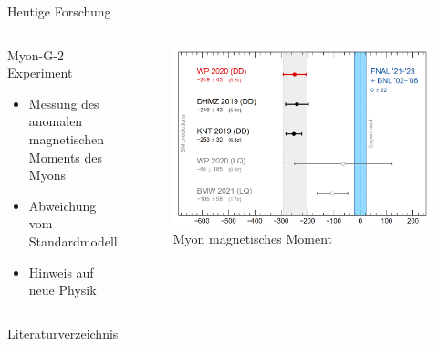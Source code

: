 \documentclass[aspectratio=169,xcolor=dvipsnames]{beamer}
\begin{document}
\begin{frame}{Heutige Forschung}
    \begin{columns}[c]
        \begin{block}{Myon-G-2 Experiment}
            \begin{itemize}
                \item Messung des anomalen magnetischen Moments des Myons
                \item Abweichung vom Standardmodell
                \item Hinweis auf neue Physik
            \end{itemize}
        \end{block}
        \begin{figure}
            \centering
            \includegraphics[width=0.9\linewidth]{figures/myonmagn.png}
            \caption{Myon magnetisches Moment}
            \label{fig:myonmagn}
        \end{figure}
    \end{columns}
\end{frame}

\begin{frame}[allowframebreaks]{Literaturverzeichnis}
    \nocite{*}
    \footnotesize
    
    
\end{frame}
\end{document}
